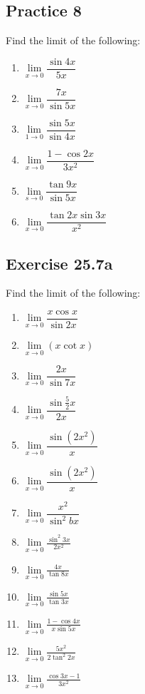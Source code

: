 \documentclass[12pt]{report}
\begin{document}
\subsection{Practice 8}

Find the limit of the following: \setlength{\columnseprule}{1pt}
\setlength{\columnsep}{24pt}
\begin{multicols}{2}
  \begin{enumerate}
    \item $\lim\limits_{x\to0}{\dfrac{\sin4x}{5x}}$
    \item $\lim\limits_{x\to0}{\dfrac{7x}{\sin5x}}$
    \item $\lim\limits_{1\to0}{\dfrac{\sin 5x}{\sin 4x}}$
    \item $\lim\limits_{x\to0}{\dfrac{1-\cos2x}{3x^{2}}}$
    \item $\lim\limits_{s\to0}{\dfrac{\tan9x}{\sin 5x}}$
    \item $\lim\limits_{x\to0}{\dfrac{\tan2x\sin3x}{x^{2}}}$
  \end{enumerate}
\end{multicols}

\subsection{Exercise 25.7a}

Find the limit of the following: \setlength{\columnseprule}{1pt}
\setlength{\columnsep}{24pt}
\begin{multicols}{2}
  \begin{enumerate}
    \item $\lim\limits_{x\to0}{\dfrac{x\cos x}{\sin2x}}$
    \item $\lim\limits_{x\to0}(x\cot x)$
    \item $\lim\limits_{x\to0}{\dfrac{2x}{\sin7x}}$
    \item $\lim\limits_{x\to0}{\dfrac{\sin{\frac{5}{2}}x}{2x}}$
    \item $\lim\limits_{x\to0}{\dfrac{\sin(2x^{2})}{x}}$
    \item $\lim\limits_{x\to0}{\dfrac{\sin(2x^{2})}{x}}$
    \item $\lim\limits_{x\to0}{\dfrac{x^{2}}{\sin^{2}b x}}$
    \item $\lim\limits_{x\to0}{\frac{\sin^{2}3x}{2x^{2}}}$
    \item $\lim\limits_{x\to0}{\frac{4x}{\tan8x}}$
    \item $\lim\limits_{x\to0}{\frac{\sin5x}{\tan3x}}$
    \item $\lim\limits_{x\to0}{\frac{1-\cos4x}{x\sin5x}}$
    \item $\lim\limits_{x\to0}{\frac{5x^{2}}{2\tan^{2}2x}}$
    \item $\lim\limits_{x\to0}{\frac{\cos3x-1}{3x^{2}}}$
  \end{enumerate}
\end{multicols}
\end{document}
